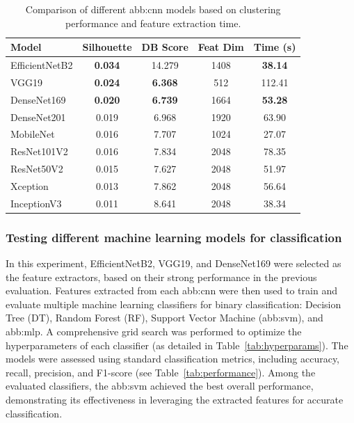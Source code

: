\begin{table}[h!]
\centering
\begin{tabular}{|l|c|c|c|c|}
\hline
\textbf{Model} & \textbf{Silhouette} & \textbf{DB Score} & \textbf{Feat Dim} & \textbf{Time (s)} \\
\hline
EfficientNetB2 & \textbf{0.034} & 14.279 & 1408 & \textbf{38.14} \\
VGG19          & \textbf{0.024} & \textbf{6.368}  & 512  & 112.41 \\
DenseNet169    & \textbf{0.020} & \textbf{6.739}  & 1664 & \textbf{53.28} \\
DenseNet201    & 0.019 & 6.968  & 1920 & 63.90 \\
MobileNet      & 0.016 & 7.707  & 1024 & 27.07 \\
ResNet101V2    & 0.016 & 7.834  & 2048 & 78.35 \\
ResNet50V2     & 0.015 & 7.627  & 2048 & 51.97 \\
Xception       & 0.013 & 7.862  & 2048 & 56.64 \\
InceptionV3    & 0.011 & 8.641  & 2048 & 38.34 \\
\hline
\end{tabular}
\caption{Comparison of different \gls{abb:cnn} models based on clustering performance and feature extraction time.}
\label{tab:cnn_comparison_res}
\end{table}







\subsubsection{Testing different machine learning models for classification}
\label{sec:MLclassifiertest}

In this experiment, EfficientNetB2, VGG19, and DenseNet169 were selected as the feature extractors, based on their strong performance in the previous evaluation. Features extracted from each \gls{abb:cnn} were then used to train and evaluate multiple machine learning classifiers for binary classification: Decision Tree (DT), Random Forest (RF), Support Vector Machine (\gls{abb:svm}), and \gls{abb:mlp}. A comprehensive grid search was performed to optimize the hyperparameters of each classifier (as detailed in Table~\ref{tab:hyperparams}). The models were assessed using standard classification metrics, including accuracy, recall, precision, and F1-score (see Table~\ref{tab:performance}). Among the evaluated classifiers, the \gls{abb:svm} achieved the best overall performance, demonstrating its effectiveness in leveraging the extracted features for accurate classification.

